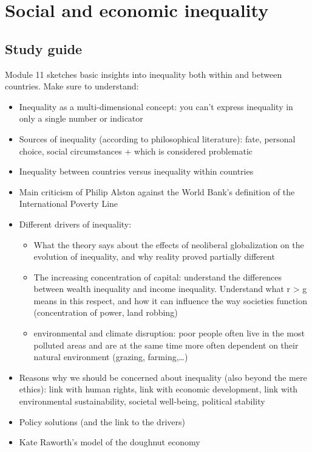 \documentclass[../summary.tex]{subfiles}
\begin{document}
	
	\section{Social and economic inequality}
	
	\subsection{Study guide}
	
	Module 11 sketches basic insights into inequality both within and between countries. Make sure to understand:
	\begin{itemize}
		\item Inequality as a multi-dimensional concept: you can’t express inequality in only a single number or indicator
		\item Sources of inequality (according to philosophical literature): fate, personal choice, social circumstances + which is considered problematic
		\item Inequality between countries versus inequality within countries
		\item Main criticism of Philip Alston against the World Bank’s 
		definition of the International Poverty Line
		\item Different drivers of inequality:
		\begin{itemize}
			\item What the theory says about the effects of neoliberal globalization on the evolution of inequality, and why reality proved partially different
			\item The increasing concentration of capital: understand the differences between wealth inequality and income inequality. Understand what r > g means in this respect, and how it can influence the way societies function (concentration of power, land robbing)
			\item environmental and climate disruption: poor people often live in the most polluted areas and are at the same time more often dependent on their natural environment (grazing, farming,…)
		\end{itemize}
		\item Reasons why we should be concerned about inequality (also beyond the mere ethics): link with human rights, link with economic development, link with environmental sustainability, societal well-being, political stability
		\item Policy solutions (and the link to the drivers)
		\item Kate Raworth’s model of the doughnut economy 
	\end{itemize}
	
\end{document}
